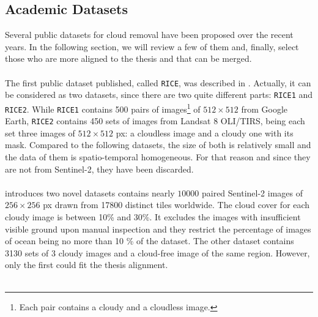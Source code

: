 \documentclass[11pt, a4paper]{article}
\begin{document}
	\subsection{Academic Datasets}
	Several public datasets for cloud removal have been proposed over the recent years. In the following section, we will review a few of them and, finally, select those who are more aligned to the thesis and that can be merged.
	\\
	\\
	The first public dataset published, called \texttt{RICE}, was described in \cite{rice}. Actually, it can be considered as two datasets, since there are two quite different parts: \texttt{RICE1} and \texttt{RICE2}. While \texttt{RICE1} contains 500 pairs of images\footnote{Each pair contains a cloudy and a cloudless image.} of $512 \times 512$ from Google Earth, \texttt{RICE2} contains 450 sets of images from Landsat 8 OLI/TIRS, being each set three images of $512 \times 512$ px: a cloudless image and a cloudy one with its mask. Compared to the following datasets, the size of both is relatively small and the data of them is spatio-temporal homogeneous. For that reason and since they are not from Sentinel-2, they have been discarded.
	\\
	\\
	\cite{sarukkai2019cloud} introduces two novel datasets contains nearly $10000$ paired Sentinel-2 images of $256 \times 256$ px	drawn from 17800 distinct tiles worldwide. The cloud cover for each cloudy image is between 10\% and 30\%. It excludes the images with insufficient visible ground upon manual inspection and they restrict the percentage of images of ocean being no more than 10 \% of the dataset. The other dataset contains 3130 sets of 3 cloudy images and a cloud-free image of the same region. However, only the first could fit the thesis alignment. 
	\\
	\\
	
\end{document}
